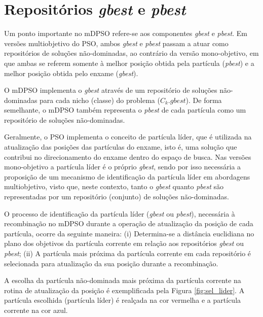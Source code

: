 \documentclass[
	12pt,				%
	openany,			%
	oneside,	
	a4paper,			%
	brazil,				%
	]{unimontes-ppgmsc-abntex2}
\begin{document}
\section{Repositórios {\em gbest} e {\em pbest}}
\label{sec:rep_best}

Um ponto importante no mDPSO refere-se aos componentes {\em gbest} e {\em pbest}. Em versões multiobjetivo do PSO, ambos {\em gbest} e {\em pbest} passam a atuar como repositórios de soluções não-dominadas, ao contrário da versão mono-objetivo, em que ambas se referem somente à melhor posição obtida pela partícula ({\em pbest}) e a melhor posição obtida pelo enxame ({\em gbest}).

O mDPSO implementa o {\em gbest} através de um repositório de soluções não-dominadas para cada nicho (classe) do problema  ($C_k.gbest$). De forma semelhante, o mDPSO também representa o {\em pbest} de cada partícula como um repositório de soluções não-dominadas.  

Geralmente, o PSO implementa o conceito de partícula líder, que é utilizada na atualização das posições das partículas do enxame, isto é, uma solução que contribui no direcionamento do enxame dentro do espaço de busca. Nas versões mono-objetivo a partícula líder é o próprio {\em gbest}, sendo por isso necessária a proposição de um mecanismo de identificação da partícula líder em abordagens multiobjetivo, visto que, neste contexto, tanto o {\em gbest} quanto {\em pbest} são representadas por um repositório (conjunto) de soluções não-dominadas. 

O processo de identificação da partícula líder ({\em gbest} ou {\em pbest}), necessária à recombinação no mDPSO durante a operação de atualização da posição de cada partícula, ocorre da seguinte maneira: (i) Determina-se a distância euclidiana no plano dos objetivos da partícula corrente em relação aos repositórios {\em gbest} ou {\em pbest}; (ii) A partícula mais próxima da partícula corrente em cada repositório é selecionada para atualização da sua posição durante a recombinação. 

A escolha da partícula não-dominada  mais próxima da partícula corrente na rotina de atualização da posição é exemplificada pela Figura \ref{fig:sel_lider}. A partícula escolhida (partícula líder) é realçada na cor vermelha e a partícula corrente na cor azul.
\end{document}
